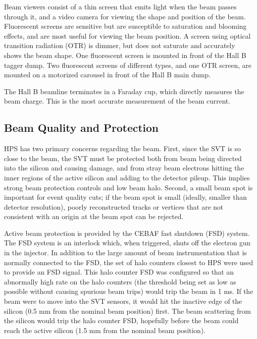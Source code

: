 Beam viewers consist of a thin screen that emits light when the beam passes through it, and a video camera for viewing the shape and position of the beam.
Fluorescent screens are sensitive but are susceptible to saturation and blooming effects, and are most useful for viewing the beam position.
A screen using optical transition radiation (OTR) is dimmer, but does not saturate and accurately shows the beam shape.
One fluorescent screen is mounted in front of the Hall B tagger dump.
Two fluorescent screens of different types, and one OTR screen, are mounted on a motorized carousel in front of the Hall B main dump.

The Hall B beamline terminates in a Faraday cup, which directly measures the beam charge.
This is the most accurate measurement of the beam current.

\subsection{Beam Quality and Protection}
HPS has two primary concerns regarding the beam.
First, since the SVT is so close to the beam, the SVT must be protected both from beam being directed into the silicon and causing damage, and from stray beam electrons hitting the inner regions of the active silicon and adding to the detector pileup.
This implies strong beam protection controls and low beam halo.
Second, a small beam spot is important for event quality cuts; if the beam spot is small (ideally, smaller than detector resolution), poorly reconstructed tracks or vertices that are not consistent with an origin at the beam spot can be rejected.

Active beam protection is provided by the CEBAF fast shutdown (FSD) system.
The FSD system is an interlock which, when triggered, shuts off the electron gun in the injector.
In addition to the large amount of beam instrumentation that is normally connected to the FSD, the set of halo counters closest to HPS were used to provide an FSD signal.
This halo counter FSD was configured so that an abnormally high rate on the halo counters (the threshold being set as low as possible without causing spurious beam trips) would trip the beam in 1 ms.
If the beam were to move into the SVT sensors, it would hit the inactive edge of the silicon (0.5 mm from the nominal beam position) first.
The beam scattering from the silicon would trip the halo counter FSD, hopefully before the beam could reach the active silicon (1.5 mm from the nominal beam position).

